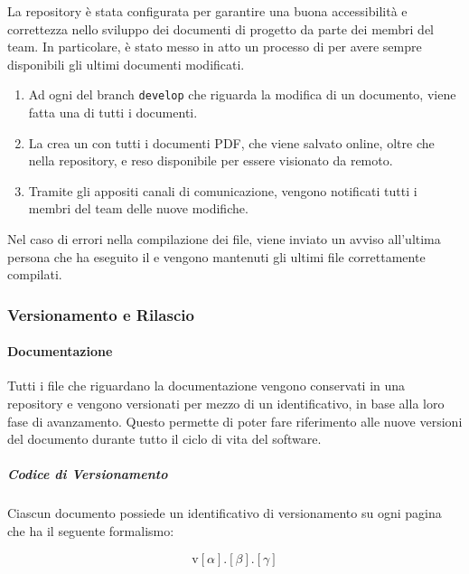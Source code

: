 		La repository è stata configurata per garantire una buona accessibilità e correttezza nello sviluppo dei documenti di progetto da parte dei membri del team. In particolare, è stato messo in atto un processo di  per avere sempre disponibili gli ultimi documenti modificati.

		\begin{enumerate}
			\item Ad ogni  del branch \verb!develop! che riguarda la modifica di un documento, viene fatta una  di tutti i documenti. 
			\item La  crea un  con tutti i documenti PDF, che viene salvato online, oltre che nella repository, e reso disponibile per essere visionato da remoto.
			\item Tramite gli appositi canali di comunicazione, vengono notificati tutti i membri del team delle nuove modifiche.
		\end{enumerate}

		Nel caso di errori nella compilazione dei file, viene inviato un avviso all'ultima persona che ha eseguito il  e vengono mantenuti gli ultimi file correttamente compilati.

			

	\subsubsection{Versionamento e Rilascio}

	\paragraph{Documentazione}

	Tutti i file che riguardano la documentazione vengono conservati in una repository e vengono versionati per mezzo di un identificativo, in base alla loro fase di avanzamento. Questo permette di poter fare riferimento alle nuove versioni del documento durante tutto il ciclo di vita del software.\\

		\subparagraph{Codice di Versionamento}

		Ciascun documento possiede un identificativo di versionamento su ogni pagina che ha il seguente formalismo:

		\[%
			\text{v}[\alpha].[\beta].[\gamma]
		\]

